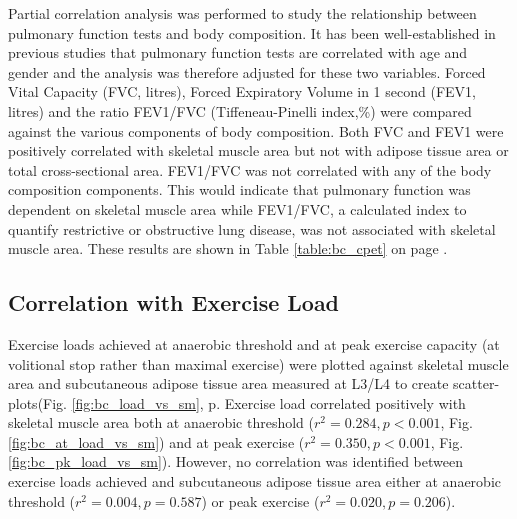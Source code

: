 Partial correlation analysis was performed to study the relationship between pulmonary function tests and body composition. It has been well-established in previous studies that pulmonary function tests are correlated with age and gender and the analysis was therefore adjusted for these two variables. Forced Vital Capacity (FVC, litres), Forced Expiratory Volume in 1 second (FEV1, litres) and the ratio FEV1/FVC (Tiffeneau-Pinelli index,\%) were compared against the various components of body composition. Both FVC and FEV1 were positively correlated with skeletal muscle area but not with adipose tissue area or total cross-sectional area. FEV1/FVC was not correlated with any of the body composition components. This would indicate that pulmonary function was dependent on skeletal muscle area while FEV1/FVC, a calculated index to quantify restrictive or obstructive lung disease, was not associated with skeletal muscle area. These results are shown in Table \ref{table:bc_cpet} on page \pageref{table:bc_cpet}.

\subsection{Correlation with Exercise Load}



Exercise loads achieved at anaerobic threshold and at peak exercise capacity (at volitional stop rather than maximal exercise) were plotted against skeletal muscle area and subcutaneous adipose tissue area measured at L3/L4 to create scatter-plots(Fig. \ref{fig:bc_load_vs_sm}, p\pageref{fig:bc_load_vs_sm}. Exercise load correlated positively with skeletal muscle area both at anaerobic threshold ($r^{2} = 0.284, p < 0.001$, Fig. \ref{fig:bc_at_load_vs_sm}) and at peak exercise ($r^{2} = 0.350, p < 0.001$, Fig. \ref{fig:bc_pk_load_vs_sm}). However, no correlation was identified between exercise loads achieved and subcutaneous adipose tissue area either at anaerobic threshold ($r^{2} = 0.004, p = 0.587$) or peak exercise ($r^{2} = 0.020, p = 0.206$). 

